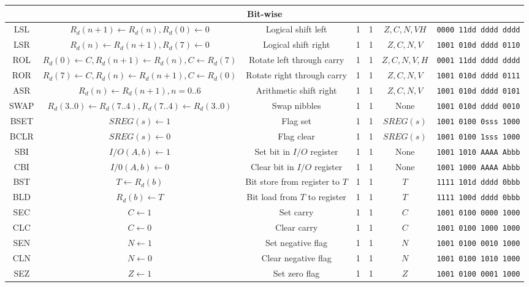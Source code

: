 \documentclass[11pt]{article}
\begin{document}
\begin{center}
\begin{longtable}{|c|c|c|c|c|c|c|}
\hline\hline
\multicolumn{7}{|c|}{Bit-wise} \\
\hline
LSL & $R_d(n+1) \leftarrow R_d(n), R_d(0) \leftarrow 0$ & Logical shift left & 1 & 1 & $Z, C, N, V H$ & \texttt{0000 11dd dddd dddd}\\
LSR & $R_d(n) \leftarrow R_d(n+1), R_d(7) \leftarrow 0$ & Logical shift right & 1 & 1 & $Z, C, N, V$ & \texttt{1001 010d dddd 0110}\\
ROL & $R_d(0) \leftarrow C, R_d(n+1) \leftarrow R_d(n), C \leftarrow R_d(7)$ & Rotate left through carry & 1 & 1 & $Z, C, N, V, H$ & \texttt{0001 11dd dddd dddd}\\
ROR & $R_d(7) \leftarrow C, R_d(n) \leftarrow R_d(n+1), C \leftarrow R_d(0)$ & Rotate right through carry & 1 & 1 & $Z, C, N, V$ & \texttt{1001 010d dddd 0111}\\
ASR & $R_d(n) \leftarrow R_d(n+1), n=0..6$ & Arithmetic shift right & 1 & 1 & $Z, C, N, V$ & \texttt{1001 010d dddd 0101}\\
SWAP & $R_d(3..0) \leftarrow R_d(7..4), R_d(7..4) \leftarrow R_d(3..0)$ & Swap nibbles & 1 & 1 & None & \texttt{1001 010d dddd 0010}\\
BSET & $SREG(s) \leftarrow 1$ & Flag set & 1 & 1 & $SREG(s)$ & \texttt{1001 0100 0sss 1000}\\
BCLR & $SREG(s) \leftarrow 0$ & Flag clear & 1 & 1 & $SREG(s)$ & \texttt{1001 0100 1sss 1000}\\
SBI & $I/O(A, b) \leftarrow 1$ & Set bit in $I/O$ register & 1 & 1 & None & \texttt{1001 1010 AAAA Abbb}\\
CBI & $I/0(A, b) \leftarrow 0$ & Clear bit in $I/O$ register & 1 & 1 & None & \texttt{1001 1000 AAAA Abbb}\\
BST & $T \leftarrow R_d(b)$ & Bit store from register to $T$ & 1 & 1 & $T$ & \texttt{1111 101d dddd 0bbb}\\
BLD & $R_d(b) \leftarrow T$ & Bit load from $T$ to register & 1 & 1 & $T$ & \texttt{1111 100d dddd 0bbb}\\
SEC & $C \leftarrow 1$ & Set carry & 1 & 1 & $C$ & \texttt{1001 0100 0000 1000}\\
CLC & $C \leftarrow 0$ & Clear carry & 1 & 1 & $C$ & \texttt{1001 0100 1000 1000}\\
SEN & $N \leftarrow 1$ & Set negative flag & 1 & 1 & $N$ & \texttt{1001 0100 0010 1000}\\
CLN & $N \leftarrow 0$ & Clear negative flag & 1 & 1 & $N$ & \texttt{1001 0100 1010 1000}\\
SEZ & $Z \leftarrow 1$ & Set zero flag & 1 & 1 & $Z$ & \texttt{1001 0100 0001 1000}\\

\end{longtable}
\end{center}
\end{document}
